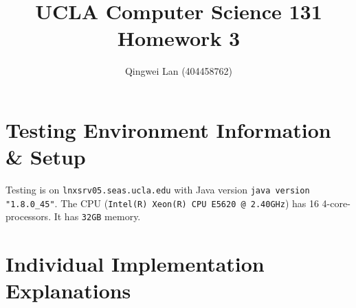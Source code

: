 \documentclass[10pt]{article}
\begin{document}
\title{UCLA Computer Science 131 Homework 3}
\author{Qingwei Lan (404458762)}

\maketitle

\section{Testing Environment Information \& Setup}

Testing is on \texttt{lnxsrv05.seas.ucla.edu} with Java version \texttt{java version "1.8.0\_45"}. The CPU (\texttt{Intel(R) Xeon(R) CPU E5620 @ 2.40GHz}) has 16 4-core-processors. It has \texttt{32GB} memory.

\section{Individual Implementation Explanations}
\end{document}
